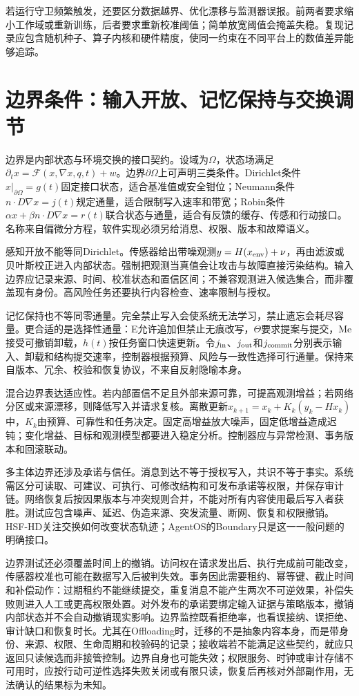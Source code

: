 若运行守卫频繁触发，还要区分数据越界、优化漂移与监测器误报。前两者要求缩小工作域或重新训练，后者要求重新校准阈值；简单放宽阈值会掩盖失稳。复现记录应包含随机种子、算子内核和硬件精度，使同一约束在不同平台上的数值差异能够追踪。

\section{边界条件：输入开放、记忆保持与交换调节}
\label{sec:section_7194}

边界是内部状态与环境交换的接口契约。设域为$\Omega$，状态场满足$\partial_tx=\mathcal F(x,\nabla x,q,t)+w$。边界$\partial\Omega$上可声明三类条件。Dirichlet条件$x|_{\partial\Omega}=g(t)$固定接口状态，适合基准值或安全钳位；Neumann条件$n\cdot D\nabla x=j(t)$规定通量，适合限制写入速率和带宽；Robin条件$\alpha x+\beta n\cdot D\nabla x=r(t)$联合状态与通量，适合有反馈的缓存、传感和行动接口。名称来自偏微分方程，软件实现必须另给消息、权限、版本和故障语义。

感知开放不能等同Dirichlet。传感器给出带噪观测$y=H(x_{\rm env})+\nu$，再由滤波或贝叶斯校正进入内部状态。强制把观测当真值会让攻击与故障直接污染结构。输入边界应记录来源、时间、校准状态和置信区间；不兼容观测进入候选集合，而非覆盖现有身份。高风险任务还要执行内容检查、速率限制与授权。

记忆保持也不等同零通量。完全禁止写入会使系统无法学习，禁止遗忘会耗尽容量。更合适的是选择性通量：E允许追加但禁止无痕改写，$\Theta$要求提案与提交，Me接受可撤销卸载，$h(t)$按任务窗口快速更新。令$j_{\rm in}$、$j_{\rm out}$和$j_{\rm commit}$分别表示输入、卸载和结构提交速率，控制器根据预算、风险与一致性选择可行通量。保持来自版本、冗余、校验和恢复协议，不来自反射隐喻本身。

混合边界表达适应性。若内部置信不足且外部来源可靠，可提高观测增益；若网络分区或来源漂移，则降低写入并请求复核。离散更新$x_{k+1}=x_k+K_k(y_k-Hx_k)$中，$K_k$由预算、可靠性和任务决定。固定高增益放大噪声，固定低增益造成迟钝；变化增益、目标和观测模型都要进入稳定分析。控制器应与异常检测、事务版本和回滚联动。

多主体边界还涉及承诺与信任。消息到达不等于授权写入，共识不等于事实。系统需区分可读取、可建议、可执行、可修改结构和可发布承诺等权限，并保存审计链。网络恢复后按因果版本与冲突规则合并，不能对所有内容使用最后写入者获胜。测试应包含噪声、延迟、伪造来源、突发流量、断网、恢复和权限撤销。HSF-HD关注交换如何改变状态轨迹；AgentOS的Boundary只是这一一般问题的明确接口。

边界测试还必须覆盖时间上的撤销。访问权在请求发出后、执行完成前可能改变，传感器校准也可能在数据写入后被判失效。事务因此需要租约、幂等键、截止时间和补偿动作：过期租约不能继续提交，重复消息不能产生两次不可逆效果，补偿失败则进入人工或更高权限处置。对外发布的承诺要绑定输入证据与策略版本，撤销内部状态并不会自动撤销现实影响。边界监控既看拒绝率，也看误接纳、误拒绝、审计缺口和恢复时长。尤其在Offloading时，迁移的不是抽象内容本身，而是带身份、来源、权限、生命周期和校验码的记录；接收端若不能满足这些契约，就应只返回只读候选而非接管控制。边界自身也可能失效；权限服务、时钟或审计存储不可用时，应按行动可逆性选择失败关闭或有限只读，恢复后再核对外部副作用，无法确认的结果标为未知。

